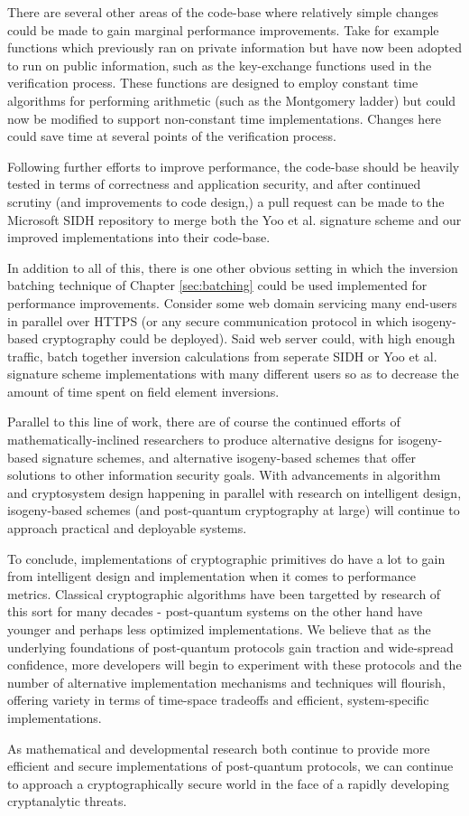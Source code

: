 There are several other areas of the code-base where relatively simple changes could be made to gain marginal performance improvements. Take for example functions which previously ran on private information but have now been adopted to run on public information, such as the key-exchange functions used in the verification process. These functions are designed to employ constant time algorithms for performing arithmetic (such as the Montgomery ladder) but could now be modified to support non-constant time implementations. Changes here could save time at several points of the verification process.

Following further efforts to improve performance, the code-base should be heavily tested in terms of correctness and application security, and after continued scrutiny (and improvements to code design,) a pull request can be made to the Microsoft SIDH repository \cite{sidhcode} to merge both the Yoo et al. signature scheme and our improved implementations into their code-base. 

In addition to all of this, there is one other obvious setting in which the inversion batching technique of Chapter \ref{sec:batching} could be used implemented for performance improvements. Consider some web domain servicing many end-users in parallel over HTTPS (or any secure communication protocol in which isogeny-based cryptography could be deployed). Said web server could, with high enough traffic, batch together inversion calculations from seperate SIDH or Yoo et al. signature scheme implementations with many different users so as to decrease the amount of time spent on field element inversions.

Parallel to this line of work, there are of course the continued efforts of mathematically-inclined researchers to produce alternative designs for isogeny-based signature schemes, and alternative isogeny-based schemes that offer solutions to other information security goals. With advancements in algorithm and cryptosystem design happening in parallel with research on intelligent design, isogeny-based schemes (and post-quantum cryptography at large) will continue to approach practical and deployable systems.
 

\vspace{50px}

To conclude, implementations of cryptographic primitives do have a lot to gain from intelligent design and implementation when it comes to performance metrics. Classical cryptographic algorithms have been targetted by research of this sort for many decades - post-quantum systems on the other hand have younger and perhaps less optimized implementations. We believe that as the underlying foundations of post-quantum protocols gain traction and wide-spread confidence, more developers will begin to experiment with these protocols and the number of alternative implementation mechanisms and techniques will flourish, offering variety in terms of time-space tradeoffs and efficient, system-specific implementations. 

As mathematical and developmental research both continue to provide more efficient and secure implementations of post-quantum protocols, we can continue to approach a cryptographically secure world in the face of a rapidly developing cryptanalytic threats. 
